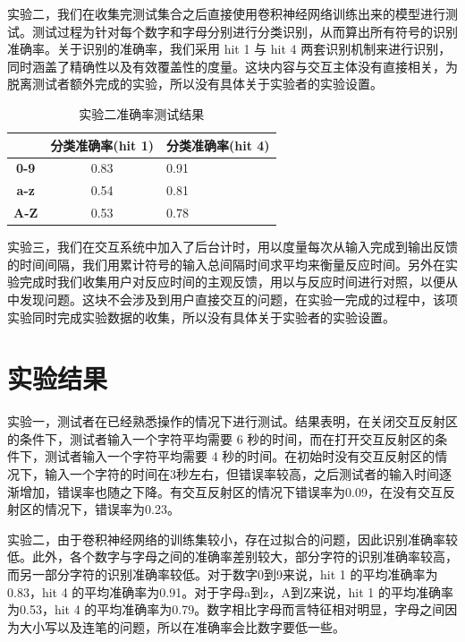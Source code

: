 \documentclass[10pt, twocolumn]{article}
\begin{document}
	实验二，我们在收集完测试集合之后直接使用卷积神经网络训练出来的模型进行测试。测试过程为针对每个数字和字母分别进行分类识别，从而算出所有符号的识别准确率。关于识别的准确率，我们采用 hit 1 与 hit 4 两套识别机制来进行识别，同时涵盖了精确性以及有效覆盖性的度量。这块内容与交互主体没有直接相关，为脱离测试者额外完成的实验，所以没有具体关于实验者的实验设置。

\begin{table}[htb]
\centering
\caption{实验二准确率测试结果}
\label{my-label}
\begin{tabular}{|c|c|l|}
\hline
\multicolumn{1}{|l|}{} & \multicolumn{1}{l|}{\textbf{分类准确率(hit 1)}} & \textbf{分类准确率(hit 4)} \\ \hline
\textbf{0-9}           & 0.83                                       & 0.91                  \\ \hline
\textbf{a-z}           & 0.54                                       & 0.81                  \\ \hline
\textbf{A-Z}           & 0.53                                       & 0.78                  \\ \hline
\end{tabular}
\end{table}

	实验三，我们在交互系统中加入了后台计时，用以度量每次从输入完成到输出反馈的时间间隔，我们用累计符号的输入总间隔时间求平均来衡量反应时间。另外在实验完成时我们收集用户对反应时间的主观反馈，用以与反应时间进行对照，以便从中发现问题。这块不会涉及到用户直接交互的问题，在实验一完成的过程中，该项实验同时完成实验数据的收集，所以没有具体关于实验者的实验设置。


\section{实验结果}

实验一，测试者在已经熟悉操作的情况下进行测试。结果表明，在关闭交互反射区的条件下，测试者输入一个字符平均需要 6 秒的时间，而在打开交互反射区的条件下，测试者输入一个字符平均需要 4 秒的时间。在初始时没有交互反射区的情况下，输入一个字符的时间在3秒左右，但错误率较高，之后测试者的输入时间逐渐增加，错误率也随之下降。有交互反射区的情况下错误率为0.09，在没有交互反射区的情况下，错误率为0.23。

实验二，由于卷积神经网络的训练集较小，存在过拟合的问题，因此识别准确率较低。此外，各个数字与字母之间的准确率差别较大，部分字符的识别准确率较高，而另一部分字符的识别准确率较低。对于数字0到9来说，hit 1 的平均准确率为0.83，hit 4 的平均准确率为0.91。对于字母a到z，A到Z来说，hit 1 的平均准确率为0.53，hit 4 的平均准确率为0.79。数字相比字母而言特征相对明显，字母之间因为大小写以及连笔的问题，所以在准确率会比数字要低一些。
\end{document}
